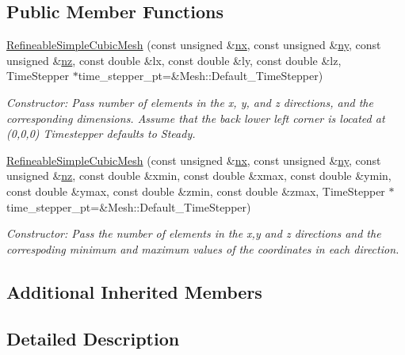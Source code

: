 \subsection*{Public Member Functions}
\begin{DoxyCompactItemize}
\item 
\hyperlink{classoomph_1_1RefineableSimpleCubicMesh_a71fab83f3bdc3f0cf7676afb5e313d10}{Refineable\+Simple\+Cubic\+Mesh} (const unsigned \&\hyperlink{classoomph_1_1SimpleCubicMesh_ad29c917ec0adb29ad24e086e3dcd0b6f}{nx}, const unsigned \&\hyperlink{classoomph_1_1SimpleCubicMesh_a16979ec3b0e88fb37730415190021c1c}{ny}, const unsigned \&\hyperlink{classoomph_1_1SimpleCubicMesh_ad78725440e4e87598fd9339653b28e61}{nz}, const double \&lx, const double \&ly, const double \&lz, Time\+Stepper $\ast$time\+\_\+stepper\+\_\+pt=\&Mesh\+::\+Default\+\_\+\+Time\+Stepper)
\begin{DoxyCompactList}\small\item\em Constructor\+: Pass number of elements in the x, y, and z directions, and the corresponding dimensions. Assume that the back lower left corner is located at (0,0,0) Timestepper defaults to Steady. \end{DoxyCompactList}\item 
\hyperlink{classoomph_1_1RefineableSimpleCubicMesh_a058dc3781f5bf9b5580380e1161ad7d5}{Refineable\+Simple\+Cubic\+Mesh} (const unsigned \&\hyperlink{classoomph_1_1SimpleCubicMesh_ad29c917ec0adb29ad24e086e3dcd0b6f}{nx}, const unsigned \&\hyperlink{classoomph_1_1SimpleCubicMesh_a16979ec3b0e88fb37730415190021c1c}{ny}, const unsigned \&\hyperlink{classoomph_1_1SimpleCubicMesh_ad78725440e4e87598fd9339653b28e61}{nz}, const double \&xmin, const double \&xmax, const double \&ymin, const double \&ymax, const double \&zmin, const double \&zmax, Time\+Stepper $\ast$time\+\_\+stepper\+\_\+pt=\&Mesh\+::\+Default\+\_\+\+Time\+Stepper)
\begin{DoxyCompactList}\small\item\em Constructor\+: Pass the number of elements in the x,y and z directions and the correspoding minimum and maximum values of the coordinates in each direction. \end{DoxyCompactList}\end{DoxyCompactItemize}
\subsection*{Additional Inherited Members}


\subsection{Detailed Description}
